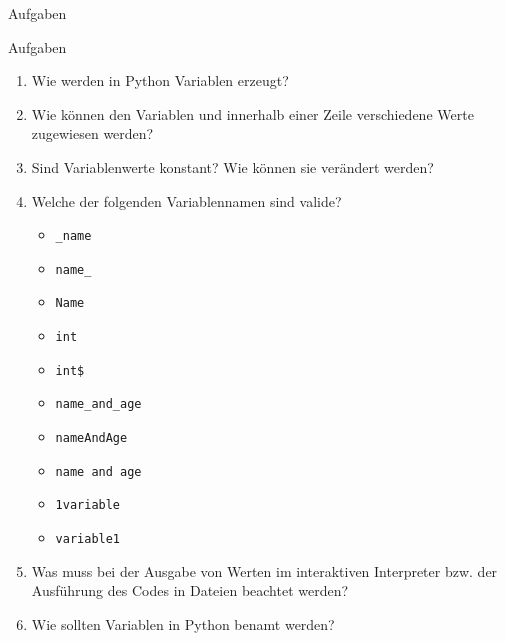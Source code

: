         \begin{subsection}{Aufgaben}
            
            \begin{frame}{Aufgaben}
            
                \begin{enumerate}
                    \item Wie werden in Python Variablen erzeugt?
                    \item Wie können den Variablen  und  innerhalb einer Zeile verschiedene Werte zugewiesen werden?
                    \item Sind Variablenwerte konstant? Wie können sie verändert werden?
                    \item Welche der folgenden Variablennamen sind valide?
                        \begin{itemize}
                            \item \texttt{\_name}
                            \item \texttt{name\_}
                            \item \texttt{Name}
                            \item \texttt{int}
                            \item \texttt{int\$}
                            \item \texttt{name\_and\_age}
                            \item \texttt{nameAndAge}
                            \item \texttt{name and age}
                            \item \texttt{1variable}
                            \item \texttt{variable1}
                        \end{itemize}
                    \item Was muss bei der Ausgabe von Werten im interaktiven Interpreter bzw. der Ausführung des Codes in Dateien beachtet werden?
                    \item Wie sollten Variablen in Python benamt werden?
                \end{enumerate}
                
            \end{frame}
        \end{subsection}
        
